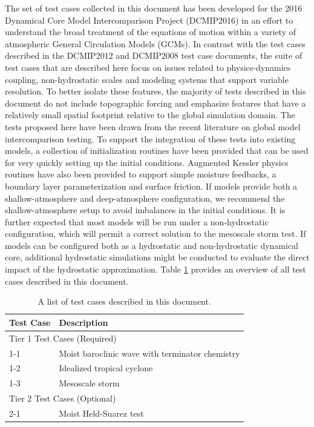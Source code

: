 \documentclass[times,doublespace]{fldauth}
\newcommand\T{\rule{0pt}{2.6ex}}
\newcommand\B{\rule[-1.2ex]{0pt}{0pt}}
\begin{document}
The set of test cases collected in this document has been developed for the 2016 Dynamical Core Model Intercomparison Project (DCMIP2016) in an effort to understand the broad treatment of the equations of motion within a variety of atmospheric General Circulation Models (GCMs). In contrast with the test cases described in the DCMIP2012 and DCMIP2008 test case documents, the suite of test cases that are described here focus on issues related to physics-dynamics coupling, non-hydrostatic scales and modeling systems that support variable resolution.  To better isolate these features, the majority of tests described in this document do not include topographic forcing and emphasize features that have a relatively small spatial footprint relative to the global simulation domain.  The tests proposed here have been drawn from the recent literature on global model intercomparison testing.  To support the integration of these tests into existing models, a collection of initialization routines have been provided that can be used for very quickly setting up the initial conditions.  Augmented Kessler physics routines have also been provided to support simple moisture feedbacks, a boundary layer parameterization and surface friction.  If models provide both a shallow-atmosphere and deep-atmosphere configuration, we recommend the shallow-atmosphere setup to avoid imbalances in the initial conditions. It is further expected that most models will be run under a non-hydrostatic configuration, which will permit a correct solution to the mesoscale storm test.  If models can be configured both as a hydrostatic and non-hydrostatic dynamical core, additional hydrostatic simulations might be conducted to evaluate the direct impact of the hydrostatic approximation.  Table \ref{tab:TestCases} provides an overview of all test cases described in this document.

\begin{table}[h]

\caption{A list of test cases described in this document.} \label{tab:TestCases}
\begin{tabular*}{\textwidth}{@{\extracolsep{\fill}}ll}
\hline Test Case \T \B& Description \\
\hline \multicolumn{2}{l}{Tier 1 Test Cases (Required)} \T \B \\
\hline 
1-1 \T & Moist baroclinic wave with terminator chemistry \\
1-2 \T & Idealized tropical cyclone \\
1-3 \T & Mesoscale storm \\
\hline \multicolumn{2}{l}{Tier 2 Test Cases (Optional)} \T \B \\  \hline 
2-1 \T \B & Moist Held-Suarez test  \\ \hline
\hline 
\end{tabular*}

\end{table}
\end{document}
